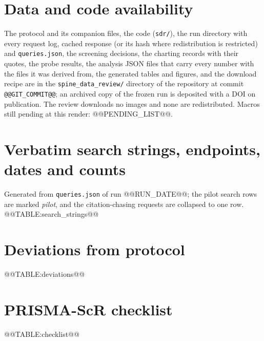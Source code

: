 \documentclass[11pt,a4paper]{article}
\makeatletter
\newcommand{\runDate}{@@RUN_DATE@@}
\makeatother
\begin{document}
\section*{Data and code availability}\label{sec:availability}
The protocol and its companion files, the code (\texttt{sdr/}), the run directory with every request log, cached response (or its hash where redistribution is restricted) and \texttt{queries.json}, the screening decisions, the charting records with their quotes, the probe results, the analysis JSON files that carry every number with the files it was derived from, the generated tables and figures, and the download recipe are in the \texttt{spine\_data\_review/} directory of the repository at commit \texttt{@@GIT_COMMIT@@}; an archived copy of the frozen run is deposited with a DOI on publication. The review downloads no images and none are redistributed. Macros still pending at this render: @@PENDING_LIST@@.




\appendix
\section{Verbatim search strings, endpoints, dates and counts}\label{app:search}
Generated from \texttt{queries.json} of run \runDate{}; the pilot search rows are marked \emph{pilot}, and the citation-chasing requests are collapsed to one row.
@@TABLE:search_strings@@

\section{Deviations from protocol}\label{app:deviations}
@@TABLE:deviations@@

\section{PRISMA-ScR checklist}\label{app:checklist}
@@TABLE:checklist@@
\end{document}

